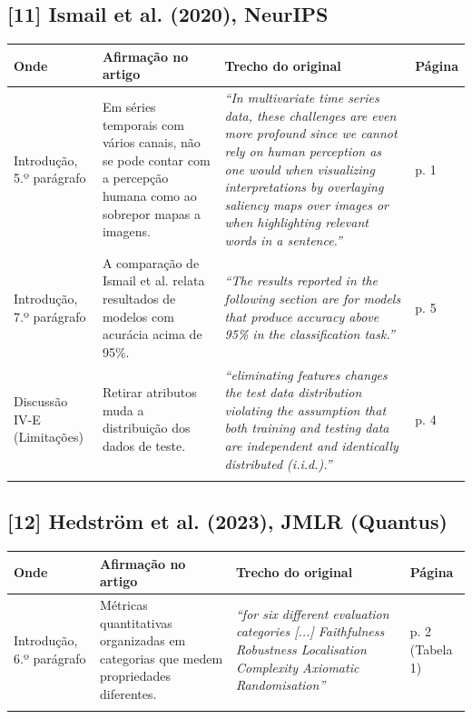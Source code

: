 \documentclass[11pt,a4paper]{article}
\begin{document}
\subsection*{[11] Ismail et al. (2020), NeurIPS}
\begin{longtable}{>{\raggedright\arraybackslash}p{2.6cm}>{\raggedright\arraybackslash}p{4.6cm}>{\raggedright\arraybackslash}p{7.6cm}>{\raggedright\arraybackslash}p{1.4cm}}
\toprule
\textbf{Onde} & \textbf{Afirmação no artigo} & \textbf{Trecho do original} & \textbf{Página} \\
\midrule
Introdução, 5.º parágrafo & Em séries temporais com vários canais, não se pode contar com a percepção humana como ao sobrepor mapas a imagens. & \textit{``In multivariate time series data, these challenges are even more profound since we cannot rely on human perception as one would when visualizing interpretations by overlaying saliency maps over images or when highlighting relevant words in a sentence.''} & p. 1 \\
\addlinespace
Introdução, 7.º parágrafo & A comparação de Ismail et al. relata resultados de modelos com acurácia acima de 95\%. & \textit{``The results reported in the following section are for models that produce accuracy above 95\% in the classification task.''} & p. 5 \\
\addlinespace
Discussão IV-E (Limitações) & Retirar atributos muda a distribuição dos dados de teste. & \textit{``eliminating features changes the test data distribution violating the assumption that both training and testing data are independent and identically distributed (i.i.d.).''} & p. 4 \\
\addlinespace
\bottomrule
\end{longtable}
\subsection*{[12] Hedström et al. (2023), JMLR (Quantus)}
\begin{longtable}{>{\raggedright\arraybackslash}p{2.6cm}>{\raggedright\arraybackslash}p{4.6cm}>{\raggedright\arraybackslash}p{7.6cm}>{\raggedright\arraybackslash}p{1.4cm}}
\toprule
\textbf{Onde} & \textbf{Afirmação no artigo} & \textbf{Trecho do original} & \textbf{Página} \\
\midrule
Introdução, 6.º parágrafo & Métricas quantitativas organizadas em categorias que medem propriedades diferentes. & \textit{``for six different evaluation categories [...] Faithfulness Robustness Localisation Complexity Axiomatic Randomisation''} & p. 2 (Tabela 1) \\
\addlinespace
\bottomrule
\end{longtable}
\end{document}
